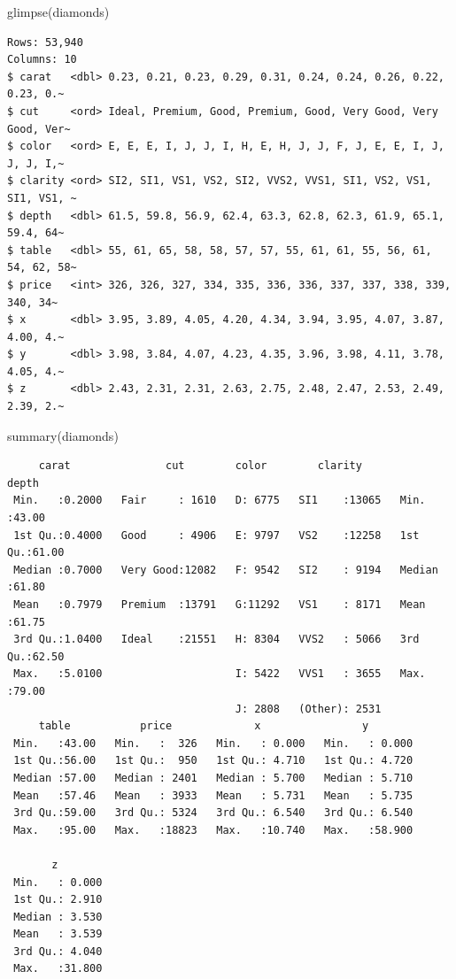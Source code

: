 \documentclass[
  letterpaper,
  DIV=11,
  numbers=noendperiod]{scrreprt}
\newenvironment{Shaded}{\begin{snugshade}}{\end{snugshade}}
\newcommand{\FunctionTok}[1]{\textcolor[rgb]{0.28,0.35,0.67}{#1}}
\newcommand{\NormalTok}[1]{\textcolor[rgb]{0.00,0.23,0.31}{#1}}
\begin{document}
\begin{Shaded}
\begin{Highlighting}[]
\FunctionTok{glimpse}\NormalTok{(diamonds)}
\end{Highlighting}
\end{Shaded}

\begin{verbatim}
Rows: 53,940
Columns: 10
$ carat   <dbl> 0.23, 0.21, 0.23, 0.29, 0.31, 0.24, 0.24, 0.26, 0.22, 0.23, 0.~
$ cut     <ord> Ideal, Premium, Good, Premium, Good, Very Good, Very Good, Ver~
$ color   <ord> E, E, E, I, J, J, I, H, E, H, J, J, F, J, E, E, I, J, J, J, I,~
$ clarity <ord> SI2, SI1, VS1, VS2, SI2, VVS2, VVS1, SI1, VS2, VS1, SI1, VS1, ~
$ depth   <dbl> 61.5, 59.8, 56.9, 62.4, 63.3, 62.8, 62.3, 61.9, 65.1, 59.4, 64~
$ table   <dbl> 55, 61, 65, 58, 58, 57, 57, 55, 61, 61, 55, 56, 61, 54, 62, 58~
$ price   <int> 326, 326, 327, 334, 335, 336, 336, 337, 337, 338, 339, 340, 34~
$ x       <dbl> 3.95, 3.89, 4.05, 4.20, 4.34, 3.94, 3.95, 4.07, 3.87, 4.00, 4.~
$ y       <dbl> 3.98, 3.84, 4.07, 4.23, 4.35, 3.96, 3.98, 4.11, 3.78, 4.05, 4.~
$ z       <dbl> 2.43, 2.31, 2.31, 2.63, 2.75, 2.48, 2.47, 2.53, 2.49, 2.39, 2.~
\end{verbatim}

\begin{Shaded}
\begin{Highlighting}[]
\FunctionTok{summary}\NormalTok{(diamonds)}
\end{Highlighting}
\end{Shaded}

\begin{verbatim}
     carat               cut        color        clarity          depth      
 Min.   :0.2000   Fair     : 1610   D: 6775   SI1    :13065   Min.   :43.00  
 1st Qu.:0.4000   Good     : 4906   E: 9797   VS2    :12258   1st Qu.:61.00  
 Median :0.7000   Very Good:12082   F: 9542   SI2    : 9194   Median :61.80  
 Mean   :0.7979   Premium  :13791   G:11292   VS1    : 8171   Mean   :61.75  
 3rd Qu.:1.0400   Ideal    :21551   H: 8304   VVS2   : 5066   3rd Qu.:62.50  
 Max.   :5.0100                     I: 5422   VVS1   : 3655   Max.   :79.00  
                                    J: 2808   (Other): 2531                  
     table           price             x                y         
 Min.   :43.00   Min.   :  326   Min.   : 0.000   Min.   : 0.000  
 1st Qu.:56.00   1st Qu.:  950   1st Qu.: 4.710   1st Qu.: 4.720  
 Median :57.00   Median : 2401   Median : 5.700   Median : 5.710  
 Mean   :57.46   Mean   : 3933   Mean   : 5.731   Mean   : 5.735  
 3rd Qu.:59.00   3rd Qu.: 5324   3rd Qu.: 6.540   3rd Qu.: 6.540  
 Max.   :95.00   Max.   :18823   Max.   :10.740   Max.   :58.900  
                                                                  
       z         
 Min.   : 0.000  
 1st Qu.: 2.910  
 Median : 3.530  
 Mean   : 3.539  
 3rd Qu.: 4.040  
 Max.   :31.800  
                 
\end{verbatim}
\end{document}
